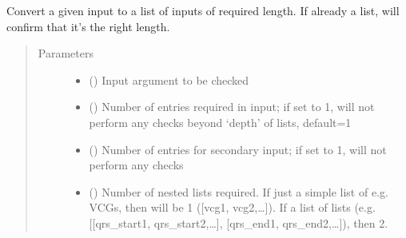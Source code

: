 \documentclass[letterpaper,10pt,english]{sphinxmanual}
\begin{document}
\begin{fulllineitems}
\label{\detokenize{_autosummary/tools.python.convert_input_to_list:tools.python.convert_input_to_list}}
\sphinxAtStartPar
Convert a given input to a list of inputs of required length. If already a list, will confirm that it’s the
right length.
\begin{quote}\begin{description}
\item[{Parameters}] \leavevmode\begin{itemize}
\item {} 
\sphinxAtStartPar
{} () \textendash{} Input argument to be checked

\item {} 
\sphinxAtStartPar
{} (\sphinxstyleliteralemphasis{\sphinxupquote{, }}) \textendash{} Number of entries required in input; if set to \sphinxhyphen{}1, will not perform any checks beyond ‘depth’ of lists,
default=1

\item {} 
\sphinxAtStartPar
{} (\sphinxstyleliteralemphasis{\sphinxupquote{, }}) \textendash{} Number of entries for secondary input; if set to \sphinxhyphen{}1, will not perform any checks

\item {} 
\sphinxAtStartPar
{} () \textendash{} Number of nested lists required. If just a simple list of e.g. VCGs, then will be 1 ({[}vcg1, vcg2,…{]}). If a
list of lists (e.g. {[}{[}qrs\_start1, qrs\_start2,…{]}, {[}qrs\_end1, qrs\_end2,…{]}), then 2.


\end{itemize}
\end{description}
\end{quote}
\end{fulllineitems}
\end{document}
